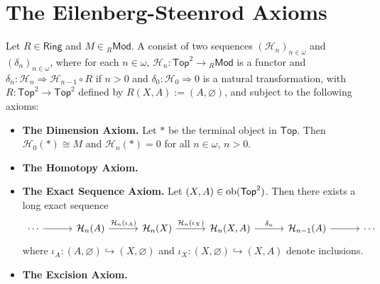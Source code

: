 \section*{The Eilenberg-Steenrod Axioms}

\begin{definition}
	Let $R \in \mathsf{Ring}$ and $M \in {_R}\mathsf{Mod}$. A  consist of two sequences $(\mathcal{H}_n)_{n \in \omega}$ and $(\delta_n)_{n \in \omega}$, where for each $n \in \omega$, $\mathcal{H}_n : \mathsf{Top}^2 \to {_R}\mathsf{Mod}$ is a functor and $\delta_n : \mathcal{H}_n \Rightarrow \mathcal{H}_{n - 1} \circ R$ if $n > 0$ and $\delta_0 : \mathcal{H}_0 \Rightarrow 0$ is a natural transformation, with $R : \mathsf{Top}^2 \to \mathsf{Top}^2$ defined by $R(X,A) := (A,\varnothing)$, and subject to the following axioms:
	\begin{itemize}[wide = 0pt]
		\item \textbf{The Dimension Axiom.} Let $\ast$ be the terminal object in $\mathsf{Top}$. Then $\mathcal{H}_0(\ast) \cong M$ and $\mathcal{H}_n(\ast) = 0$ for all $n \in \omega$, $n > 0$. 
		\item \textbf{The Homotopy Axiom.} 
		\item \textbf{The Exact Sequence Axiom.} Let $(X,A) \in \operatorname{ob}(\mathsf{Top}^2)$. Then there exists a long exact sequence
			\begin{equation*}
				\begin{tikzcd}[column sep=7ex]
					\cdots \arrow[r] & \mathcal{H}_n(A) \arrow[r,"\mathcal{H}_n(\iota_A)"] & \mathcal{H}_n(X) \arrow[r,"\mathcal{H}_n(\iota_X)"] & \mathcal{H}_n(X,A) \arrow[r,"\delta_n"] & \mathcal{H}_{n - 1}(A) \arrow[r] & \cdots
				\end{tikzcd}
			\end{equation*}
			\noindent where $\iota_A : (A,\varnothing) \hookrightarrow (X,\varnothing)$ and $\iota_X : (X,\varnothing) \hookrightarrow (X,A)$ denote inclusions.
		\item \textbf{The Excision Axiom.}
	\end{itemize}
\end{definition}
